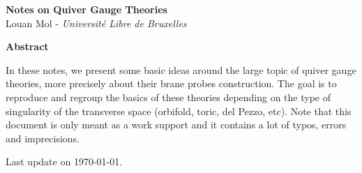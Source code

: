 \begin{titlepage}


	\begin{center}

	{\Huge{\bfseries{Notes on Quiver Gauge Theories}}}\\[0.7cm]

	Louan Mol - \textit{Université Libre de Bruxelles}

	\vspace{10cm}
	
	{\large\textbf{Abstract}}
	\end{center}
	
	    \quad In these notes, we present some basic ideas around the large topic of quiver gauge theories, more precisely about their brane probes construction.  The goal is to reproduce and regroup the basics of these theories depending on the type of singularity of the transverse space (orbifold, toric, del Pezzo, etc). Note that this document is only meant as a work support and it contains a lot of typos, errors and imprecisions.
	    
	\vfill

	\hfill Last update on \today.
	
\end{titlepage}